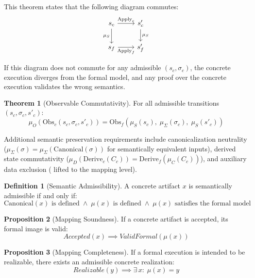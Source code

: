 \documentclass[11pt,a4paper]{article}
\theoremstyle{definition}
\newtheorem{definition}{Definition}[section]
\newtheorem{theorem}{Theorem}[section]
\newtheorem{proposition}[theorem]{Proposition}
\newcommand{\Apply}{\mathrm{Apply}}
\newcommand{\Obs}{\mathrm{Obs}}
\newcommand{\Derive}{\mathrm{Derive}}
\newcommand{\Canonical}{\mathrm{Canonical}}
\begin{document}
This theorem states that the following diagram commutes:
\begin{equation*}
\begin{tikzcd}
s_c \arrow[r, "\Apply_c"] \arrow[d, "\mu_S"'] & s'_c \arrow[d, "\mu_S"] \\
s_f \arrow[r, "\Apply_f"'] & s'_f
\end{tikzcd}
\end{equation*}

If this diagram does not commute for any admissible $(s_c, \sigma_c)$, the concrete execution diverges from the formal model, and any proof over the concrete execution validates the wrong semantics.

\begin{theorem}[Observable Commutativity]
\label{thm:observable-commutativity}
For all admissible transitions $(s_c, \sigma_c, s'_c)$:
\begin{equation}
\mu_O(\Obs_c(s_c, \sigma_c, s'_c)) = \Obs_f(\mu_S(s_c),\; \mu_\Sigma(\sigma_c),\; \mu_S(s'_c))
\end{equation}
\end{theorem}

Additional semantic preservation requirements include canonicalization neutrality ($\mu_\Sigma(\sigma) = \mu_\Sigma(\Canonical(\sigma))$ for semantically equivalent inputs), derived state commutativity ($\mu_D(\Derive_c(C_c)) = \Derive_f(\mu_C(C_c))$), and auxiliary data exclusion ( lifted to the mapping level).

\begin{definition}[Semantic Admissibility]
\label{def:semantic-admissibility}
A concrete artifact $x$ is semantically admissible if and only if:
\begin{equation}
\Canonical(x) \text{ is defined} \;\land\; \mu(x) \text{ is defined} \;\land\; \mu(x) \text{ satisfies the formal model}
\end{equation}
\end{definition}

\begin{proposition}[Mapping Soundness]
\label{prop:mapping-soundness}
If a concrete artifact is accepted, its formal image is valid:
\begin{equation}
\mathit{Accepted}(x) \implies \mathit{ValidFormal}(\mu(x))
\end{equation}
\end{proposition}

\begin{proposition}[Mapping Completeness]
\label{prop:mapping-completeness}
If a formal execution is intended to be realizable, there exists an admissible concrete realization:
\begin{equation}
\mathit{Realizable}(y) \implies \exists\, x:\; \mu(x) = y
\end{equation}
\end{proposition}
\end{document}
